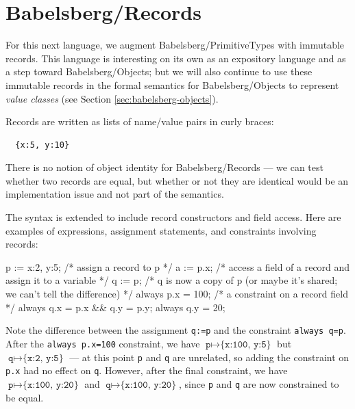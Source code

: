 \documentclass{article}
\newcommand{\eval}[3]{\texttt{#1} $\vdash$ \texttt{#2} $\Downarrow$ \texttt{#3}}
\newcommand{\step}[5]{\texttt{<#1|#2|#3>} $\longrightarrow$
  \texttt{<#4|#5>}}
\newcommand{\inferrule}[3]{\infrule[#1]{\mbox{#2}}{\mbox{#3}}}
\newcounter{examples}
\begin{document}
\inferrule{S-WhileSkip}{
  \eval{E}{e}{false}
}{
  \step{E}{C}{while e do s}{E}{C}
}


\section{Babelsberg/Records}
\label{sec:babelsberg-records}

For this next language, we augment Babelsberg/PrimitiveTypes with
immutable records.  This language is interesting on its own as an
expository language and as a step toward Babelsberg/Objects; but we
will also continue to use these immutable records in the formal
semantics for Babelsberg/Objects to represent \emph{value classes}
(see Section \ref{sec:babelsberg-objects}).

Records are written as lists of name/value pairs in curly braces:
\begin{verbatim}
  {x:5, y:10}
\end{verbatim}

There is no notion of object identity for Babelsberg/Records --- we can
test whether two records are equal, but whether or not they are
identical would be an implementation issue and not part of the semantics.

The syntax is extended to include record constructors and field
access.  Here are examples of expressions, assignment statements, and
constraints involving records:

\begin{example}
p := {x:2, y:5};   /* assign a record to p */
a := p.x;          /* access a field of a record and assign it to
                      a variable */
q := p;            /* q is now a copy of p (or maybe it's shared;
                      we can't tell the difference) */
always p.x = 100;  /* a constraint on a record field */
always q.x = p.x && q.y = p.y;
always q.y = 20;
\end{example}

Note the difference between the assignment \verb|q:=p| and the
constraint \verb|always q=p|.  After the \verb|always p.x=100|
constraint, we have $\texttt{p} \mapsto \texttt{\{x:100, y:5\}}$ but
$\texttt{q} \mapsto \texttt{\{x:2, y:5\}}$ --- at this point \verb|p|
and \verb|q| are unrelated, so adding the constraint on \verb|p.x| had no
effect on \verb|q|.  However, after the final constraint, we have
$\texttt{p} \mapsto \texttt{\{x:100, y:20\}}$ and
$\texttt{q} \mapsto \texttt{\{x:100, y:20\}}$, since \verb|p| and
\verb|q| are now constrained to be equal.
\end{document}
